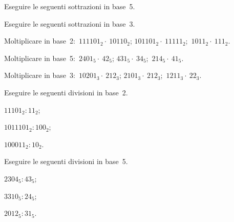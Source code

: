 \begin{esercizio}
 \label{ese:4.25}
 Eseguire le seguenti sottrazioni in base~5.

 
\end{esercizio}

\begin{esercizio}
 \label{ese:4.26}
 Eseguire le seguenti sottrazioni in base~3.

 
\end{esercizio}


\begin{esercizio}
 \label{ese:4.27}
Moltiplicare in base~2:~\quad$111101_{2}\cdot~10110_{2}$;\quad
$101101_{2}\cdot~11111_{2}$;\quad~$1011_{2}\cdot~111_{2}$.
\end{esercizio}

\begin{esercizio}
 \label{ese:4.28}
Moltiplicare in base~5:~\quad$2401_{5}\cdot~42_{5}$;\quad
$431_{5}\cdot~34_{5}$;\quad~$214_{5}\cdot~41_{5}$.
\end{esercizio}

\begin{esercizio}
 \label{ese:4.29}
Moltiplicare in base~3:~\quad$10201_{3}\cdot~212_{3}$;\quad
$2101_{3}\cdot~212_{3}$;\quad~$1211_{3}\cdot~22_{3}$.
\end{esercizio}

\begin{esercizio}[\Ast]
\label{ese:4.30}
Eseguire le seguenti divisioni in base~2.
 \begin{multicols}{3}
 \begin{enumeratea}
  \item $11101_2:11_2$;
  \item $1011101_2:100_2$;
  \item $100011_2:10_2$.
 \end{enumeratea}
 \end{multicols}
\end{esercizio}

\begin{esercizio}[\Ast]
\label{ese:4.31}
Eseguire le seguenti divisioni in base~5.
 \begin{multicols}{3}
 \begin{enumeratea}
  \item $2304_5:43_5$;
  \item $3310_5:24_5$;
  \item $2012_5:31_5$.
 \end{enumeratea}
 \end{multicols}
\end{esercizio}

